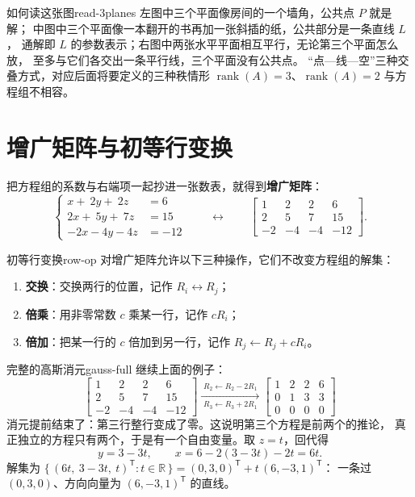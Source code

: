 \documentclass[11pt,a4paper,openany]{ctexbook}
\DeclareMathOperator{\rank}{rank}
\newcommand{\R}{\mathbb{R}}
\begin{document}
\begin{remk}{如何读这张图}{read-3planes}
左图中三个平面像房间的一个墙角，公共点 $P$ 就是解；
中图中三个平面像一本翻开的书再加一张斜插的纸，公共部分是一条直线 $L$，
通解即 $L$ 的参数表示；右图中两张水平平面相互平行，无论第三个平面怎么放，
至多与它们各交出一条平行线，三个平面没有公共点。
“点—线—空”三种交叠方式，对应后面将要定义的三种秩情形
$\rank(A)=3$、$\rank(A)=2$ 与方程组不相容。
\end{remk}

\section{增广矩阵与初等行变换}

把方程组的系数与右端项一起抄进一张数表，就得到\textbf{增广矩阵}：
\[
\left\{
\begin{aligned}
x+\ 2y+\ 2z&=6\\
2x+\ 5y+\ 7z&=15\\
-2x-4y-4z&=-12
\end{aligned}\right.
\qquad\longleftrightarrow\qquad
\left[\begin{array}{ccc|c}
1 & 2 & 2 & 6\\
2 & 5 & 7 & 15\\
-2 & -4 & -4 & -12
\end{array}\right].
\]

\begin{defn}{初等行变换}{row-op}
对增广矩阵允许以下三种操作，它们不改变方程组的解集：
\begin{enumerate}[label=(\arabic*)]
\item \textbf{交换}：交换两行的位置，记作 $R_i\leftrightarrow R_j$；
\item \textbf{倍乘}：用非零常数 $c$ 乘某一行，记作 $cR_i$；
\item \textbf{倍加}：把某一行的 $c$ 倍加到另一行，记作 $R_j\leftarrow R_j+cR_i$。
\end{enumerate}
\end{defn}

\begin{exmp}{完整的高斯消元}{gauss-full}
继续上面的例子：
\[
\left[\begin{array}{ccc|c}1&2&2&6\\2&5&7&15\\-2&-4&-4&-12\end{array}\right]
\xrightarrow[\;R_3\leftarrow R_3+2R_1\;]{\;R_2\leftarrow R_2-2R_1\;}
\left[\begin{array}{ccc|c}1&2&2&6\\0&1&3&3\\0&0&0&0\end{array}\right]
\]
消元提前结束了：第三行整行变成了零。这说明第三个方程是前两个的推论，
真正独立的方程只有两个，于是有一个自由变量。取 $z=t$，回代得
\[
y=3-3t,\qquad x=6-2(3-3t)-2t=6t.
\]
解集为
$\{\,(6t,\ 3-3t,\ t)^{\mathsf T}: t\in\R\,\}
=(0,3,0)^{\mathsf T}+t\,(6,-3,1)^{\mathsf T}$：
一条过 $(0,3,0)$、方向向量为 $(6,-3,1)^{\mathsf T}$ 的直线。
\end{exmp}
\end{document}
